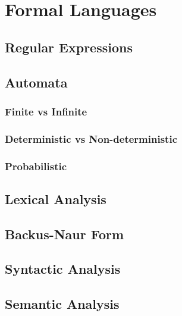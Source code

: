 \chapter{Formal Languages}


\section{Regular Expressions}


\section{Automata}


\subsection{Finite vs Infinite}


\subsection{Deterministic vs Non-deterministic}


\subsection{Probabilistic}


\section{Lexical Analysis}


\section{Backus-Naur Form}


\section{Syntactic Analysis}


\section{Semantic Analysis}
